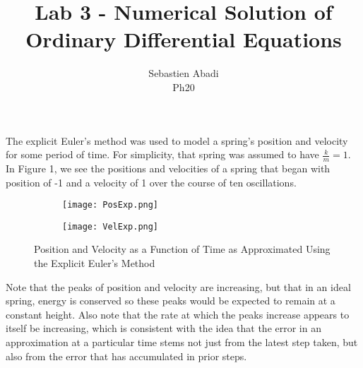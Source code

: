 \documentclass[10pt]{article}
\newenvironment{problem}[2][Problem]{\begin{trivlist}
\item[\hskip \labelsep {\bfseries #1}\hskip \labelsep {\bfseries #2.}]}{\end{trivlist}}
\begin{document}
 
\title{Lab 3 - Numerical Solution of Ordinary Differential Equations}
\author{Sebastien Abadi\\
Ph20}
\maketitle
 
\begin{problem}{1} 
The explicit Euler's method was used to model a spring's position and velocity for some period of time. For simplicity, that spring was assumed to have $\frac{k}{m}=1$. In Figure 1, we see the positions and velocities of a spring that began with position of -1 and a velocity of 1 over the course of ten oscillations.
\begin{figure}[h]
\centering
\begin{subfigure}{.45\textwidth}
  \centering
  \texttt{[image: PosExp.png]}
\end{subfigure}%
\begin{subfigure}{.45\textwidth}
  \centering
  \texttt{[image: VelExp.png]}
\end{subfigure}
\caption{Position and Velocity as a Function of Time as Approximated Using the Explicit Euler's Method}
\end{figure}

Note that the peaks of position and velocity are increasing, but that in an ideal spring, energy is conserved so these peaks would be expected to remain at a constant height. Also note that the rate at which the peaks increase appears to itself be increasing, which is consistent with the idea that the error in an approximation at a particular time stems not just from the latest step taken, but also from the error that has accumulated in prior steps.

\end{problem}
\end{document}
